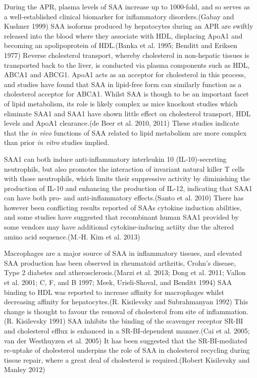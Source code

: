 \documentclass[9pt,lineno]{elife}
\begin{document}
\begin{landscape}
\begin{landscape}
During the APR, plasma levels of SAA increase up to 1000-fold, and so serves as a well-established clinical biomarker for inflammatory disorders.(Gabay and Kushner 1999) SAA isoforms produced by hepatocytes during an APR are swiftly released into the blood where they associate with HDL, displacing ApoA1 and becoming an apolipoprotein of HDL.(Banka et al. 1995; Benditt and Eriksen 1977) Reverse cholesterol transport, whereby cholesterol in non-hepatic tissues is transported back to the liver, is conducted via plasma components such as HDL, ABCA1 and ABCG1. ApoA1 acts as an acceptor for cholesterol in this process, and studies have found that SAA in lipid-free form can similarly function as a cholesterol acceptor for ABCA1. Whilst SAA is though to be an important facet of lipid metabolism, its role is likely complex as mice knockout studies which eliminate SAA1 and SAA1 have shown little effect on cholesterol transport, HDL levels and ApoA1 clearance.(de Beer et al. 2010, 2011) These studies indicate that the \emph{in vivo} functions of SAA related to lipid metabolism are more complex than prior \emph{in vitro} studies implied.

SAA1 can both induce anti-inflammatory interleukin 10 (IL-10)-secreting neutrophils, but also promotes the interaction of invariant natural killer T cells with those neutrophils, which limits their suppressive activity by diminishing the production of IL-10 and enhancing the production of IL-12, indicating that SAA1 can have both pro- and anti-inflammatory effects.(Santo et al. 2010) There has however been conflicting results reported of SAAs cytokine induction abilities, and some studies have suggested that recombinant human SAA1 provided by some vendors may have additional cytokine-inducing actiity due the altered amino acid sequence.(M.-H. Kim et al. 2013)

Macrophages are a major source of SAA in inflammatory tissues, and elevated SAA production has been observed in rheumatoid arthritis, Crohn's disease, Type 2 diabetes and atherosclerosis.(Marzi et al. 2013; Dong et al. 2011; Vallon et al. 2001; C, F, and B 1997; Meek, Urieli-Shoval, and Benditt 1994) SAA binding to HDL was reported to increase affinity for macrophages whilst decreasing affinity for hepatocytes.(R. Kisilevsky and Subrahmanyan 1992) This change is thought to favour the removal of cholesterol from site of inflammation.(R. Kisilevsky 1991) SAA inhibits the binding of the scavenger receptor SR-BI and cholesterol efflux is enhanced in a SR-BI-dependent manner.(Cai et al. 2005; van der Westhuyzen et al. 2005) It has been suggested that the SR-BI-mediated re-uptake of cholesterol underpins the role of SAA in cholesterol recycling during tissue repair, where a great deal of cholesterol is required.(Robert Kisilevsky and Manley 2012)


\end{landscape}
\end{landscape}
\end{document}
